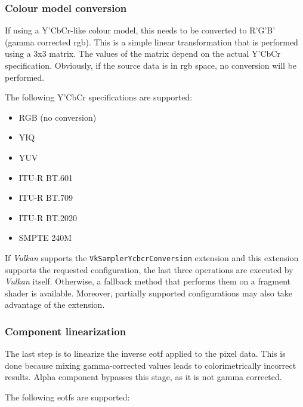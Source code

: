 \documentclass[../main.tex]{subfiles}
\begin{document}
\subsubsection{Colour model conversion}

If using a Y'CbCr-like colour model, this needs to be converted to R'G'B' (gamma corrected \gls{rgb}). This is a simple linear transformation that is performed using a 3x3 matrix. The values of the matrix depend on the actual Y'CbCr specification. Obviously, if the source data is in \gls{rgb} space, no conversion will be performed. \newline

The following Y'CbCr specifications are supported:

\begin{itemize}
    \item RGB (no conversion)
    \item YIQ
    \item YUV
    \item ITU-R BT.601\cite{bt601}
    \item ITU-R BT.709\cite{bt709}
    \item ITU-R BT.2020\cite{bt2020}
    \item SMPTE 240M\cite{smpte240M}
\end{itemize}


If \textit{Vulkan} supports the \texttt{VkSamplerYcbcrConversion} extension and this extension supports the requested configuration, the last three operations are executed by \textit{Vulkan} itself. Otherwise, a fallback method that performs them on a fragment shader is available. Moreover, partially supported configurations may also take advantage of the extension.\newline

\subsubsection{Component linearization}

The last step is to linearize the inverse \gls{eotf} applied to the \gls{pixel} data. This is done because mixing gamma-corrected values leads to colorimetrically incorrect results. Alpha component bypasses this stage, as it is not gamma corrected.\newline

The following \glspl{eotf} are supported:
\end{document}
